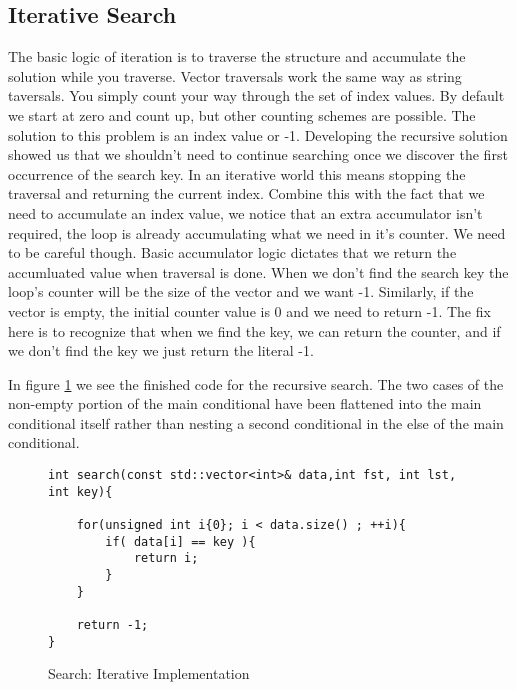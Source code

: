 \documentclass[]{tufte-handout}
\begin{document}
\subsection{Iterative Search}

The basic logic of iteration is to traverse the structure and accumulate the solution while you traverse. Vector traversals work the same way as string taversals. You simply count your way through the set of index values\sidenote{[0,size)}. By default we start at zero and count up, but other counting schemes are possible. The solution to this problem is an index value or -1.  Developing the recursive solution showed us that we shouldn't need to continue searching once we discover the first occurrence of the search key. In an iterative world this means stopping the traversal and returning the current index. Combine this with the fact that we need to accumulate an index value, we notice that an extra accumulator isn't required, the loop is already accumulating what we need in it's counter. We need to be careful though. Basic accumulator logic dictates that we return the accumluated value when traversal is done.  When we don't find the search key the loop's counter will be the size of the vector and we want -1. Similarly, if the vector is empty, the initial counter value is 0 and we need to return -1. The fix here is to recognize that when we find the key, we can return the counter, and if we don't find the key we just return the literal -1.

In figure \ref{code:searchiter} we see the finished code for the recursive search. The two cases of the non-empty portion of the main conditional have been flattened into the main conditional itself rather than nesting a second conditional in the else of the main conditional.
\begin{figure}[htpb!]
\begin{lstlisting}
int search(const std::vector<int>& data,int fst, int lst, int key){

    for(unsigned int i{0}; i < data.size() ; ++i){
    	if( data[i] == key ){
			return i;
		}
    }

    return -1;
}
\end{lstlisting}
\label{code:searchiter}
\caption{Search: Iterative Implementation}
\end{figure}
\end{document}
